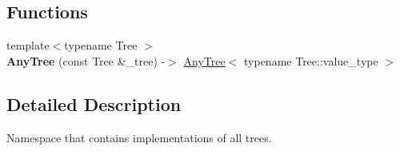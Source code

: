 \subsection*{Functions}
\begin{DoxyCompactItemize}
\item 
\mbox{\label{namespacelab_1_1forest_ae2a6f2027fb35965ce66d355d7a6ccad}} 
{\footnotesize template$<$typename Tree $>$ }\\{\bfseries Any\+Tree} (const Tree \&\+\_\+tree) -\/$>$ \hyperlink{classlab_1_1forest_1_1AnyTree}{Any\+Tree}$<$ typename Tree\+::value\+\_\+type $>$
\end{DoxyCompactItemize}


\subsection{Detailed Description}
Namespace that contains implementations of all trees. 